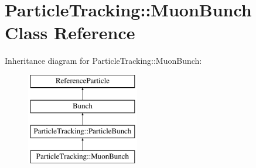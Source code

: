 \hypertarget{classParticleTracking_1_1MuonBunch}{}\section{Particle\+Tracking\+:\+:Muon\+Bunch Class Reference}
\label{classParticleTracking_1_1MuonBunch}
Inheritance diagram for Particle\+Tracking\+:\+:Muon\+Bunch\+:\begin{figure}[H]
\begin{center}
\leavevmode
\includegraphics[height=4.000000cm]{classParticleTracking_1_1MuonBunch}
\end{center}
\end{figure}
